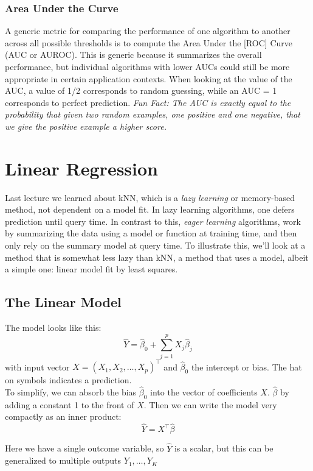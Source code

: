 \documentclass[a4paper]{article}
\begin{document}
\subsubsection{Area Under the Curve}
A generic metric for comparing the performance of one algorithm to another across all possible thresholds is to compute the Area Under the [ROC] Curve (AUC or AUROC).  This is generic because it summarizes the overall performance, but individual algorithms with lower AUCs could still be more appropriate in certain application contexts. When looking at the value of the AUC, a value of 1/2 corresponds to random guessing, while an AUC = 1 corresponds to perfect prediction. 
\textit{Fun Fact: The AUC is exactly equal to the probability that given two random examples, one positive and one negative, that we give the positive example a higher score.}


\section{Linear Regression}
Last lecture we learned about kNN, which is a \emph{lazy learning} or memory-based method, not dependent on a model fit. In lazy learning algorithms, one defers prediction until query time.  In contrast to this, \emph{eager learning} algorithms, work by summarizing the data using a model or function at training time, and then only rely on the summary model at query time.  To illustrate this, we'll look at a method that is somewhat less lazy than kNN, a method that uses a model, albeit a simple one: linear model fit by least squares.

\subsection{The Linear Model}

The model looks like this:
$${\hat Y} = {\hat \beta}_0+\sum_{j=1}^p X_j{\hat \beta}_j$$
with input vector $X=(X_1,X_2,\ldots,X_p)^\top$ and ${\hat \beta}_0$ the intercept or bias.  The hat on symbols indicates a prediction. \\

To simplify, we can absorb the bias ${\hat \beta}_0$ into the vector of coefficients $X$. $\hat{\beta}$ by adding a constant 1 to the front of $X$.  Then we can write the model very compactly as an inner product:
$$\hat{Y}=X^\top\hat{\beta}$$

Here we have a single outcome variable, so $\hat Y$ is a scalar, but this can be generalized to multiple outputs $Y_1,\ldots,Y_K$ \\
\end{document}
